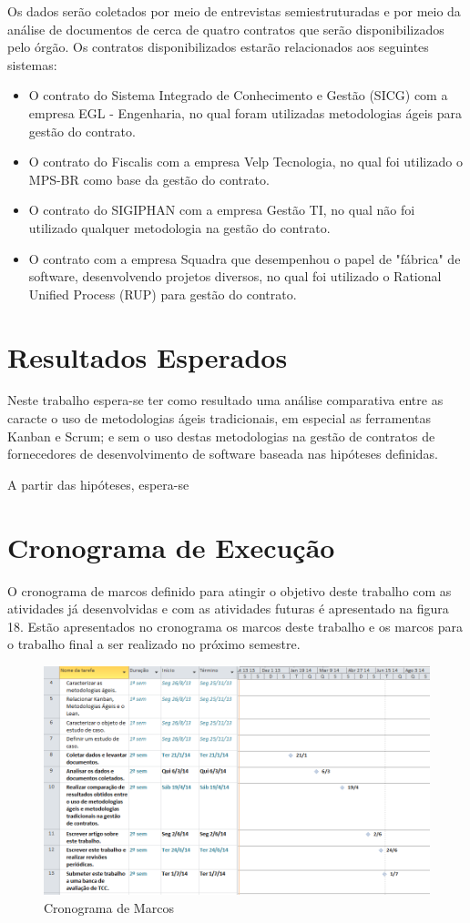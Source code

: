 Os dados serão coletados por meio de entrevistas semiestruturadas e por meio da análise de documentos de cerca de quatro contratos que serão disponibilizados pelo órgão. Os contratos disponibilizados estarão relacionados aos seguintes sistemas:
\begin{itemize}
\item  O contrato do Sistema Integrado de Conhecimento e Gestão (SICG) com a empresa EGL - Engenharia, no qual foram utilizadas metodologias ágeis para gestão do contrato.
\item  O contrato do Fiscalis com a empresa Velp Tecnologia, no qual foi utilizado o MPS-BR como base da gestão do contrato.
\item  O contrato do SIGIPHAN com a empresa Gestão TI, no qual não foi utilizado qualquer metodologia na gestão do contrato.
\item  O contrato com a empresa Squadra que desempenhou o papel de "fábrica" de software, desenvolvendo projetos diversos, no qual foi utilizado o Rational Unified Process (RUP) para gestão do contrato.
\end{itemize}

\section[Resultados Esperados]{Resultados Esperados}

Neste trabalho espera-se ter como resultado uma análise comparativa entre as caracte o uso de metodologias ágeis
tradicionais, em especial as ferramentas Kanban e Scrum; e sem o uso destas metodologias na gestão de contratos de fornecedores de desenvolvimento de software baseada nas hipóteses definidas.

A partir das hipóteses, espera-se 

\section[Cronograma de Execução]{Cronograma de Execução}

O cronograma de marcos definido para atingir o objetivo deste trabalho com as atividades já desenvolvidas e com as atividades futuras é apresentado na figura 18. Estão apresentados  no cronograma os marcos deste trabalho e os marcos para o trabalho final a ser realizado no próximo semestre.

\begin{figure}[H]
		\centering
		\label{fig02}
			\includegraphics[scale=0.6]{figuras/cronograma2.png}
		\caption{Cronograma de Marcos}
\end{figure}
